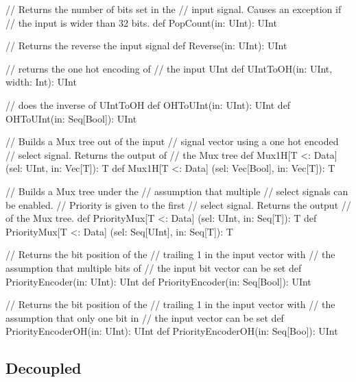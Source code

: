 \documentclass[10pt,twocolumn]{article}
\begin{document}
\begin{scala}
// Returns the number of bits set in the 
// input signal. Causes an exception if 
// the input is wider than 32 bits.
def PopCount(in: UInt): UInt

// Returns the reverse the input signal
def Reverse(in: UInt): UInt

// returns the one hot encoding of
// the input UInt
def UIntToOH(in: UInt, width: Int): UInt

// does the inverse of UIntToOH
def OHToUInt(in: UInt): UInt
def OHToUInt(in: Seq[Bool]): UInt

// Builds a Mux tree out of the input 
// signal vector using a one hot encoded 
// select signal. Returns the output of 
// the Mux tree
def Mux1H[T <: Data]
      (sel: UInt, in: Vec[T]): T
def Mux1H[T <: Data]
      (sel: Vec[Bool], in: Vec[T]): T

// Builds a Mux tree under the
// assumption that multiple
// select signals can be enabled.
// Priority is given to the first 
// select signal. Returns the output 
// of the Mux tree.
def PriorityMux[T <: Data]
      (sel: UInt, in: Seq[T]): T
def PriorityMux[T <: Data]
      (sel: Seq[UInt], in: Seq[T]): T

// Returns the bit position of the
// trailing 1 in the input vector with
// the assumption that multiple bits of
// the input bit vector can be set
def PriorityEncoder(in: UInt): UInt
def PriorityEncoder(in: Seq[Bool]): UInt

// Returns the bit position of the
// trailing 1 in the input vector with
// the assumption that only one bit in 
// the input vector can be set
def PriorityEncoderOH(in: UInt): UInt
def PriorityEncoderOH(in: Seq[Boo]): UInt
\end{scala}

\subsection{Decoupled}
\end{document}
